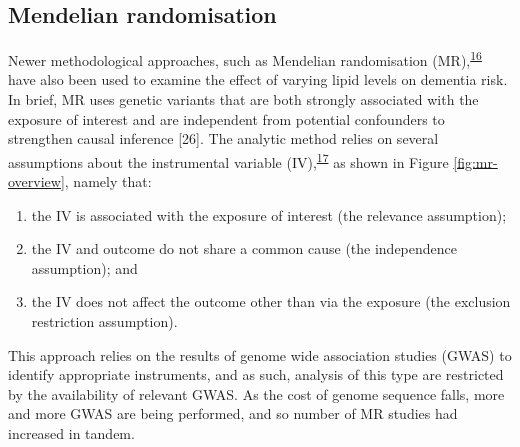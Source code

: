 \documentclass[a4paper, twoside]{templates/ociamthesis}
\providecommand{\tightlist}{%
  \setlength{\itemsep}{0pt}\setlength{\parskip}{0pt}}
\begin{document}
\hypertarget{mendelian-randomisation}{%
\subsection{Mendelian randomisation}\label{mendelian-randomisation}}

Newer methodological approaches, such as Mendelian randomisation (MR),\textsuperscript{\protect\hyperlink{ref-daveysmith2014}{16}} have also been used to examine the effect of varying lipid levels on dementia risk. In brief, MR uses genetic variants that are both strongly associated with the exposure of interest and are independent from potential confounders to strengthen causal inference {[}26{]}. The analytic method relies on several assumptions about the instrumental variable (IV),\textsuperscript{\protect\hyperlink{ref-davies2018}{17}} as shown in Figure \ref{fig:mr-overview}, namely that:

\begin{enumerate}
\def\labelenumi{\arabic{enumi}.}
\tightlist
\item
  the IV is associated with the exposure of interest (the relevance assumption);
\item
  the IV and outcome do not share a common cause (the independence assumption); and
\item
  the IV does not affect the outcome other than via the exposure (the exclusion restriction assumption).
\end{enumerate}

This approach relies on the results of genome wide association studies (GWAS) to identify appropriate instruments, and as such, analysis of this type are restricted by the availability of relevant GWAS. As the cost of genome sequence falls, more and more GWAS are being performed, and so number of MR studies had increased in tandem.
\end{document}
